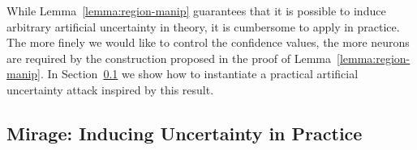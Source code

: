 While Lemma~\ref{lemma:region-manip} guarantees that it is possible to induce arbitrary artificial uncertainty in theory, it is cumbersome to apply in practice. The more finely we would like to control the confidence values, the more neurons are required by the construction proposed in the proof of Lemma~\ref{lemma:region-manip}. In Section~\ref{sec:uncertainty-training} we show how to instantiate a practical artificial uncertainty attack inspired by this result. 







\subsection{Mirage: Inducing Uncertainty in Practice} \label{sec:uncertainty-training}

